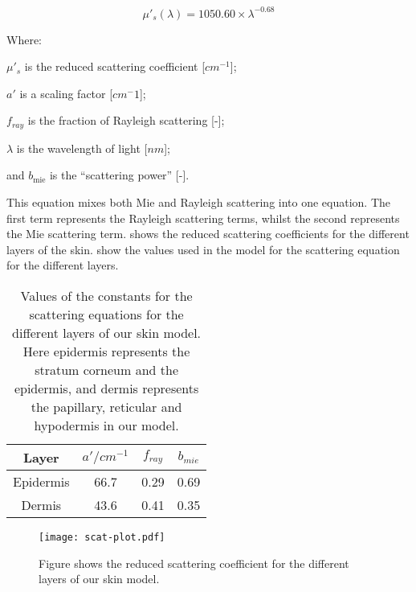 \begin{equation}
\mu'_s(\lambda)=1050.60\times\lambda^{-0.68}
\label{eqn:hyposcat}
\end{equation}


\noindent Where:

	$\mu'_s$ is the reduced scattering coefficient [$cm^{-1}$];

	$a'$ is a scaling factor [$cm^-1$];

	$f_{ray}$ is the fraction of Rayleigh scattering [-];

	$\lambda$ is the wavelength of light [$nm$];

	and $b_{\text{mie}}$ is the ``scattering power'' [-].

\medskip

This equation mixes both Mie and Rayleigh scattering into one equation.
The first term represents the Rayleigh scattering terms, whilst the second represents the Mie scattering term.
 shows the reduced scattering coefficients for the different layers of the skin.
 show the values used in the model for the scattering equation for the different layers.

\begin{table}[!htpb]
  \centering

  \begin{tabular}{|c|c|c|c|}
  \hline

  Layer & $a'/cm^{-1}$ & $f_{ray}$ & $b_{mie}$ \\
  \hline
   Epidermis         & 66.7 & 0.29 & 0.69 \\
   Dermis  & 43.6 & 0.41 & 0.35 \\

  \hline
  \end{tabular}
  \caption{Values of the constants for the scattering equations for the different layers of our skin model. Here epidermis represents the stratum corneum and the epidermis, and dermis represents the papillary, reticular and hypodermis in our model.}
  \label{tab:valscat}

\end{table}

\begin{figure}[!htpb]
	\centering
	\texttt{[image: scat-plot.pdf]}
	\caption{Figure shows the reduced scattering coefficient for the different layers of our skin model.}
	\label{fig:scatplot}
\end{figure}

\FloatBarrier

